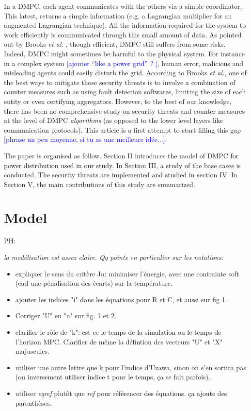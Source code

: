 \documentclass[conference]{IEEEtran}
\newcommand{\rem}[1]{\textcolor{blue}{[#1]}}
\begin{document}
In a DMPC, each agent communicates with the others via a simple coordinator. This latest, returns a simple information (e.g. a Lagrangian multiplier for an augmented Lagrangian technique). All the information required for the system to work efficiently is communicated through this small amount of data. As pointed out by Brooks \emph{et al.} \cite{Brooks}, though efficient, DMPC still suffers from some risks. Indeed, DMPC might sometimes be harmful to the physical system. For instance in a complex system \rem{ajouter ``like a power grid'' ? }, human error, malicious and misleading agents could easily disturb the grid. According to Brooks \emph{et al.}, one of the best ways to mitigate those security threats is to involve a combination of counter measures such as using fault detection softwares, limiting the size of each entity or even certifying aggregators. However, to the best of our knowledge, there has been no comprehensive study on security threats and counter measures at the level of DMPC \emph{algorithms} (as opposed to the lower level layers like communication protocols).
This article is a first attempt to start filling this gap \rem{phrase un peu moyenne, si tu as une meilleure idée...}.

The paper is organised as follow.  Section II introduces the model of DMPC for power distribution used in our study. In Section III,  a study of the base cases is conducted. The security threats are implemented and studied in section IV. In Section V, the main contributions of this study are summarized.


\section{Model}

PH: {\itshape
la modélisation est assez claire. Qq points en particulier sur les  notations:

\begin{itemize}
  \item expliquer le sens du critère Ju: minimiser l'énergie, avec une contrainte soft (cad une pénalisation des écarts) sur la température.
  \item ajouter les indices "i" dans les équations pour R et C, et aussi sur fig 1.
  \item Corriger "U" en "u" sur fig. 1 et 2.
  \item clarifier le rôle de "k": est-ce le temps de la simulation ou le temps de l'horizon MPC. Clarifier de même la défintion des vecteurs "U" et "X" majuscules.
  \item utiliser une autre lettre que k pour l'indice d'Uzawa, sinon on s'en sortira pas (ou inversement utiliser indice t pour le temps, ça se fait parfois).
  \item utiliser \emph{eqref} plutôt que \emph{ref} pour référencer des équations. ça ajoute des parenthèses.
\end{itemize}
}
\end{document}
